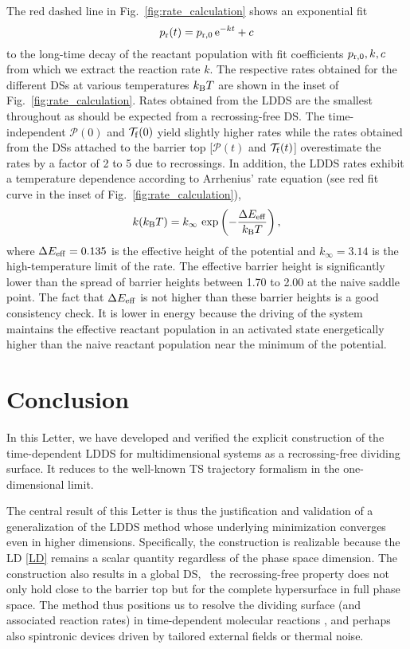 \documentclass{elsarticle}
\def\EDITS#1{{\color{green}#1}}
\def\EDITS#1{#1}
\def\EDITS#1{{\color{mygreen}#1}}
\begin{document}
The red dashed line in Fig.~\ref{fig:rate_calculation} shows an exponential 
fit 
% 
\begin{equation}
p_\mathrm{r}(t) = p_\mathrm{r,0}\,\mathrm{e}^{-kt} + c
\label{eq:fit-exponential}
\end{equation}
% 
to the long-time decay of the reactant population
with fit coefficients $p_\mathrm{r,0}, k, c$ from which we extract the reaction rate 
$k$.
The respective rates obtained for the different DSs 
at various temperatures $k_\mathrm{B}T$ are shown in the inset of 
Fig.~\ref{fig:rate_calculation}.
% 
Rates obtained from the LDDS are the smallest throughout 
as should be
expected from a recrossing-free DS.
The time-independent $\mathcal{P}(0)$ and $\mathcal{T}_\mathrm{f}(0)$ 
yield slightly higher rates while the 
rates obtained from the DSs attached to the barrier top [$\mathcal{P}(t)$ and 
$\mathcal{T}_\mathrm{f}(t)$] overestimate the rates by a factor of 2 to 5 due to 
recrossings.
% 
In addition, the LDDS rates exhibit a temperature dependence according to 
Arrhenius' rate
equation (see red fit curve in the inset of Fig.~\ref{fig:rate_calculation}),
% 
\begin{equation}
k(k_\mathrm{B}T) = 
k_\infty\,\exp\left(-\frac{\Delta E_\mathrm{eff}}{k_\mathrm{B}T}\right),
\end{equation}
where $\Delta E_\mathrm{eff}=0.135$ is the effective height of the potential 
and $k_\infty = 3.14$ is the high-temperature limit of the rate.
The effective barrier height is significantly lower than the spread of 
barrier heights between 1.70 to 2.00 at the naive saddle point. 
The fact that $\Delta E _\mathrm{eff}$
is not higher than these barrier heights is a good consistency check.
It is lower in energy because the driving of the system
maintains the effective reactant population
in an activated state energetically higher than the
naive reactant population near the minimum of the potential.

\section{Conclusion}


In this Letter,
we have developed and verified the 
explicit construction of the time-dependent LDDS 
for multidimensional systems as a recrossing-free dividing surface.
It reduces to the well-known TS trajectory \cite{dawn05a}
formalism in the one-dimensional limit.

The central result of this Letter is thus the justification and validation
of a generalization of the 
\EDITS{LDDS}
method whose underlying
minimization converges even in higher dimensions.
%
Specifically, the construction is realizable 
because the LD \eqref{LD} 
remains a scalar quantity regardless of the phase space dimension.
The construction also results in a global DS, 
\ie~the recrossing-free property does not only hold close 
to the barrier top but for the complete hypersurface in full phase space.
The method thus positions us to resolve the dividing
surface (and associated reaction rates)
in time-dependent 
molecular reactions
\cite{Yamanouchi2002,Sussman2006,Kawai11laser,Keshavamurthy2009,
Keshavamurthy2015,Revuelta2015},
and perhaps also spintronic devices 
\cite{Taniguchi2013,Apalkov2005}
driven by tailored external fields or thermal noise.
\end{document}
